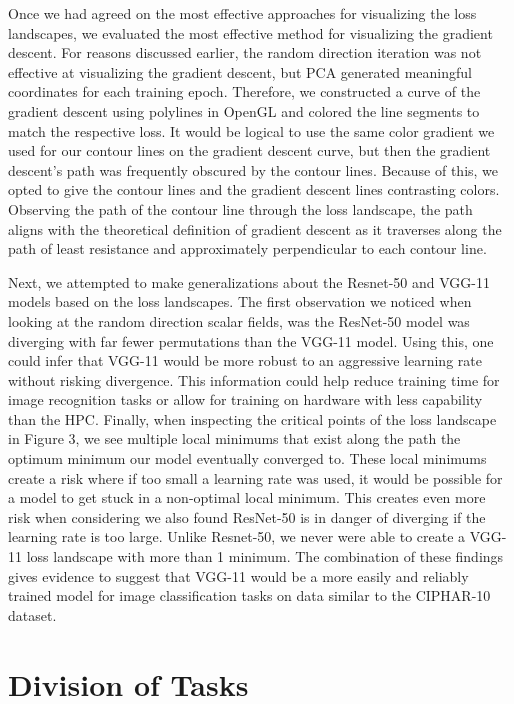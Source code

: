 \documentclass{acmsiggraph}
\begin{document}
Once we had agreed on the most effective approaches for visualizing the loss landscapes, we evaluated the most effective method for visualizing the gradient descent. For reasons discussed earlier, the random direction iteration was not effective at visualizing the gradient descent, but PCA generated meaningful coordinates for each training epoch. Therefore, we constructed a curve of the gradient descent using polylines in OpenGL and colored the line segments to match the respective loss. It would be logical to use the same color gradient we used for our contour lines on the gradient descent curve, but then the gradient descent's path was frequently obscured by the contour lines. Because of this, we opted to give the contour lines and the gradient descent lines contrasting colors. Observing the path of the contour line through the loss landscape, the path aligns with the theoretical definition of gradient descent as it traverses along the path of least resistance and approximately perpendicular to each contour line.

Next, we attempted to make generalizations about the Resnet-50 and VGG-11 models based on the loss landscapes. The first observation we noticed when looking at the random direction scalar fields, was the ResNet-50 model was diverging with far fewer permutations than the VGG-11 model. Using this, one could infer that VGG-11 would be more robust to an aggressive learning rate without risking divergence. This information could help reduce training time for image recognition tasks or allow for training on hardware with less capability than the HPC. Finally, when inspecting the critical points of the loss landscape in Figure 3, we see multiple local minimums that exist along the path the optimum minimum our model eventually converged to. These local minimums create a risk where if too small a learning rate was used, it would be possible for a model to get stuck in a non-optimal local minimum. This creates even more risk when considering we also found ResNet-50 is in danger of diverging if the learning rate is too large. Unlike Resnet-50, we never were able to create a VGG-11 loss landscape with more than 1 minimum. The combination of these findings gives evidence to suggest that VGG-11 would be a more easily and reliably trained model for image classification tasks on data similar to the CIPHAR-10 dataset.

\section{Division of Tasks}
\label{sec:intro}
\end{document}
